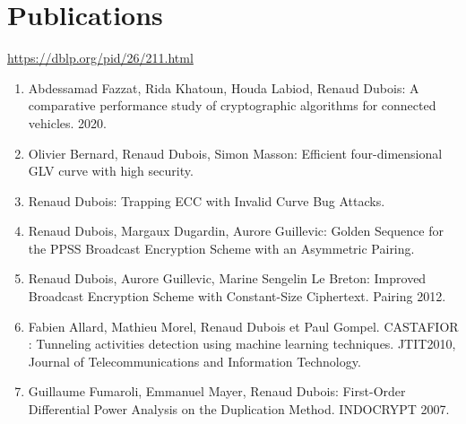 \documentclass[letter,10pt]{article}
\begin{document}
\section{Publications}
 \url{https://dblp.org/pid/26/211.html}
 \begin{enumerate}
  \item Abdessamad Fazzat, Rida Khatoun, Houda Labiod, Renaud Dubois: A comparative performance study of cryptographic algorithms for connected vehicles. 2020.
 \item 	Olivier Bernard, Renaud Dubois, Simon Masson: Efficient four-dimensional GLV curve with high security.
 \item Renaud Dubois: Trapping ECC with Invalid Curve Bug Attacks. 
 \item Renaud Dubois, Margaux Dugardin, Aurore Guillevic: Golden Sequence for the PPSS Broadcast Encryption Scheme with an Asymmetric Pairing.
 \item Renaud Dubois, Aurore Guillevic, Marine Sengelin Le Breton:
Improved Broadcast Encryption Scheme with Constant-Size Ciphertext. Pairing 2012. 
\item Fabien Allard, Mathieu Morel, Renaud Dubois et Paul Gompel. CASTAFIOR : Tunneling activities detection using machine learning techniques. JTIT2010, Journal of Telecommunications and Information Technology. 
 \item 	Guillaume Fumaroli, Emmanuel Mayer, Renaud Dubois:
First-Order Differential Power Analysis on the Duplication Method. INDOCRYPT 2007.
 \end{enumerate} 
 
   
\end{document}
